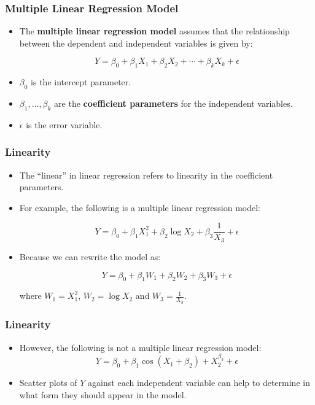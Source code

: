 \documentclass[14pt]{beamer}
\begin{document}
\begin{frame}
	\frametitle{Multiple Linear Regression Model}
	
	\begin{itemize}[label={\color{blue}$\blacktriangleright$}]
		\item The \textbf{multiple linear regression model} assumes that the relationship between the dependent and independent variables is given by:
		

			\[
			Y = \beta_0 + \beta_1X_1 + \beta_2X_2 + \cdots + \beta_kX_k + \epsilon
			\]
		
		\item $\beta_0$ is the intercept parameter.
		
		\item $\beta_1,\ldots,\beta_k$ are the \textbf{coefficient parameters} for the independent variables.
		
		\item $\epsilon$ is the error variable.
	\end{itemize}
	
\end{frame}
\begin{frame}
	\frametitle{Linearity}
	
	\begin{itemize}[label={\color{blue}$\blacktriangleright$}]
		\item The ``linear'' in linear regression refers to linearity in the coefficient parameters.
		
		\item For example, the following is a multiple linear regression model:
		

			\[
			Y = \beta_0 + \beta_1X_1^2 + \beta_2\log X_2 + \beta_3\frac{1}{X_3} + \epsilon
			\]

		
		\item Because we can rewrite the model as:
		

			\[
			Y = \beta_0 + \beta_1W_1 + \beta_2W_2 + \beta_3W_3 + \epsilon
			\]

			where $W_1 = X_1^2$, $W_2 = \log X_2$ and $W_3 = \frac{1}{X_3}$.

	\end{itemize}
	
\end{frame}
\begin{frame}
	\frametitle{Linearity}
	
	\begin{itemize}[label={\color{blue}$\blacktriangleright$}]
		\item However, the following is not a multiple linear regression model:
		\[
		Y = \beta_0 + \beta_1\cos(X_1 + \beta_2) + X_2^{\beta_3} + \epsilon
		\]
		
		\item Scatter plots of $Y$ against each independent variable can help to determine in what form they should appear in the model.
	\end{itemize}
	
\end{frame}
\end{document}
